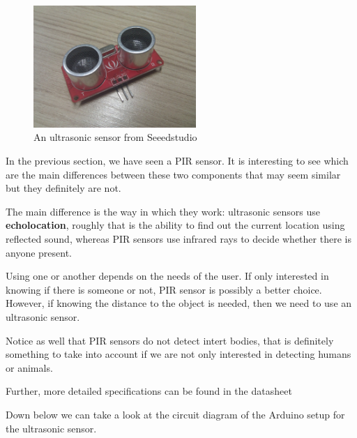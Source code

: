 \begin{figure}[H]
    \centering
    \includegraphics[width=0.55\textwidth]{fig/ultrasonic.jpg}
    \caption{An ultrasonic sensor from Seeedstudio}
    \label{fig:ultrasonic}
\end{figure}

In the previous section, we have seen a PIR sensor. It is interesting to see which are the main differences between these two components that may seem similar but they definitely are not.

	The main difference is the way in which they work: ultrasonic sensors use \textbf{echolocation}\cite{echolocation}, roughly that is the ability to find out the current location using reflected sound, whereas PIR sensors use infrared rays to decide whether there is anyone present.

	Using one or another depends on the needs of the user. If only interested in knowing if there is someone or not, PIR sensor is possibly a better choice. However, if knowing the distance to the object is needed, then we need to use an ultrasonic sensor.

	Notice as well that PIR sensors do not detect intert bodies, that is definitely something to take into account if we are not only interested in detecting humans or animals.

Further, more detailed specifications can be found in the datasheet\cite{ultrasonic-datasheet}

\vspace{7mm}
Down below we can take a look at the circuit diagram of the Arduino setup for the ultrasonic sensor.
		
